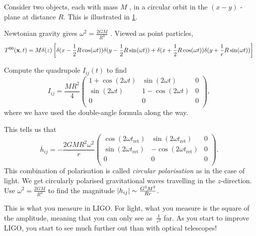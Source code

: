 \begin{example}
  Consider two objects, each with mass $M$ , in a circular orbit in the $(x-y)$ -plane at distance $R$. 
  This is illustrated in \ref{fig:l22f2}.
  \begin{figure}[tbhp]
    \centering
    \def\svgwidth{0.4\columnwidth}
    
    \caption{}
    \label{fig:l22f2}
  \end{figure}

  Newtonian gravity gives $\omega^2 = \frac{2 G M }{R^3}$ . Viewed as point particles, 
  \begin{equation}
    T^{00}(\vb{x}, t) = M \delta(z) \left[ \delta(x - \frac{1}{2} R \cos(\omega t)) \delta(y - \frac{1}{2} R \sin(\omega t)) + \delta(x + \frac{1}{2} R \cos(\omega t)) \delta(y + \frac{1}{r} R \sin(\omega t)) \right]
  \end{equation}

  Compute the quadrupole $I_{ij}(t)$  to find 
  \begin{equation}
    I_{ij} = \frac{MR^2}{4}
    \begin{pmatrix}
     1 + \cos(2 \omega t) & \sin(2 \omega t) & 0 \\
     \sin(2 \omega t) & 1 - \cos(2\omega t) & 0 \\
     0 & 0 & 0 \\
    \end{pmatrix},
  \end{equation}
  where we have used the double-angle formula along the way.

  This tells us that 
  \begin{equation}
    \overline{h}_{ij} = - \frac{2 G M R^2 \omega^2}{r} 
    \begin{pmatrix}
     \cos(2 \omega t_{\text{ret}}) & \sin(2 \omega t_{\text{ret}}) & 0 \\
     \sin(2 \omega t_{\text{ret}}) & - \cos(2 \omega t_{\text{ret}}) & 0 \\
     0 & 0 & 0 \\
    \end{pmatrix}.
  \end{equation}
  This combination of polarisation is called \emph{circular polarisation} as in the case of light.
  We get circularly polarised gravitational waves travelling in the $z$-direction.
  Use $\omega^2 =\frac{2 GM}{R^3}$ to find the magnitude $\abs{h_{ij}} \sim \frac{G^2M^2}{R r}$.

  This is what you measure in LIGO.
  For light, what you measure is the square of the amplitude, meaning that you can only see as $~\frac{1}{r^2}$ far. As you start to improve LIGO, you start to see much further out than with optical telescopes!


\end{example}
